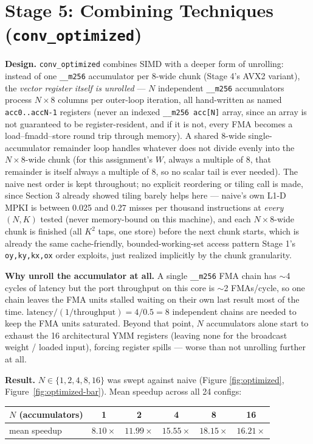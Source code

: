 \documentclass[11pt]{article}
\begin{document}
\section{Stage 5: Combining Techniques (\texttt{conv\_optimized})}
\label{sec:optimized}

\textbf{Design.} \texttt{conv\_optimized} combines SIMD with a deeper form of unrolling:
instead of one \texttt{\_\_m256} accumulator per 8-wide chunk (Stage 4's AVX2 variant), the
\emph{vector register itself is unrolled} --- $N$ independent \texttt{\_\_m256}
accumulators process $N{\times}8$ columns per outer-loop iteration, all hand-written as
named \texttt{acc0..accN-1} registers (never an indexed \texttt{\_\_m256 acc[N]} array, since
an array is not guaranteed to be register-resident, and if it is not, every FMA becomes a
load–fmadd–store round trip through memory). A shared 8-wide single-accumulator remainder
loop handles whatever does not divide evenly into the $N{\times}8$-wide chunk (for this
assignment's $W$, always a multiple of 8, that remainder is itself always a multiple of 8,
so no scalar tail is ever needed). The naive nest order is kept throughout; no explicit
reordering or tiling call is made, since Section 3 already showed tiling barely helps here
--- naive's own L1-D MPKI is between 0.025 and 0.27 misses per thousand instructions at
\emph{every} $(N,K)$ tested (never memory-bound on this machine), and each $N{\times}8$-wide
chunk is finished (all $K^2$ taps, one store) before the next chunk starts, which is already
the same cache-friendly, bounded-working-set access pattern Stage 1's \texttt{oy,ky,kx,ox}
order exploits, just realized implicitly by the chunk granularity.

\textbf{Why unroll the accumulator at all.} A single \texttt{\_\_m256} FMA chain has
$\sim$4 cycles of latency but the port throughput on this core is $\sim$2 FMAs/cycle, so one
chain leaves the FMA units stalled waiting on their own last result most of the time.
$\text{latency} / (1/\text{throughput}) = 4 / 0.5 = 8$ independent chains are needed to keep
the FMA units saturated. Beyond that point, $N$ accumulators alone start to exhaust the 16
architectural YMM registers (leaving none for the broadcast weight / loaded input), forcing
register spills --- worse than not unrolling further at all.

\textbf{Result.} $N \in \{1,2,4,8,16\}$ was swept against naive (Figure
\ref{fig:optimized}, Figure~\ref{fig:optimized-bar}). Mean speedup across all 24 configs:

\begin{center}
\begin{tabular}{lccccc}
\toprule
$N$ (accumulators) & 1 & 2 & 4 & \textbf{8} & 16 \\
\midrule
mean speedup & $8.10\times$ & $11.99\times$ & $15.55\times$ & $\mathbf{18.15\times}$ & $16.21\times$ \\
\bottomrule
\end{tabular}
\end{center}
\end{document}
